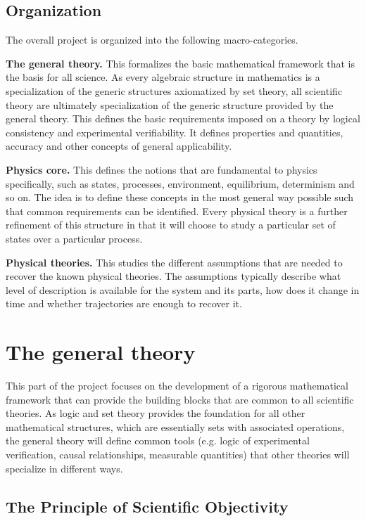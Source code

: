 \documentclass[twocolumn]{article}
\begin{document}
\subsection{Organization}

The overall project is organized into the following macro-categories.

\textbf{The general theory.} This formalizes the basic mathematical framework that is the basis for all science. As every algebraic structure in mathematics is a specialization of the generic structures axiomatized by set theory, all scientific theory are ultimately specialization of the generic structure provided by the general theory. This defines the basic requirements imposed on a theory by logical consistency and experimental verifiability. It defines properties and quantities, accuracy and other concepts of general applicability.

\textbf{Physics core.} This defines the notions that are fundamental to physics specifically, such as states, processes, environment, equilibrium, determinism and so on. The idea is to define these concepts in the most general way possible such that common requirements can be identified. Every physical theory is a further refinement of this structure in that it will choose to study a particular set of states over a particular process.

\textbf{Physical theories.} This studies the different assumptions that are needed to recover the known physical theories. The assumptions typically describe what level of description is available for the system and its parts, how does it change in time and whether trajectories are enough to recover it.

\section{The general theory}

This part of the project focuses on the development of a rigorous mathematical framework that can provide the building blocks that are common to all scientific theories. As logic and set theory provides the foundation for all other mathematical structures, which are essentially sets with associated operations, the general theory will define common tools (e.g. logic of experimental verification, causal relationships, measurable quantities) that other theories will specialize in different ways.

\subsection{The Principle of Scientific Objectivity}
\end{document}
